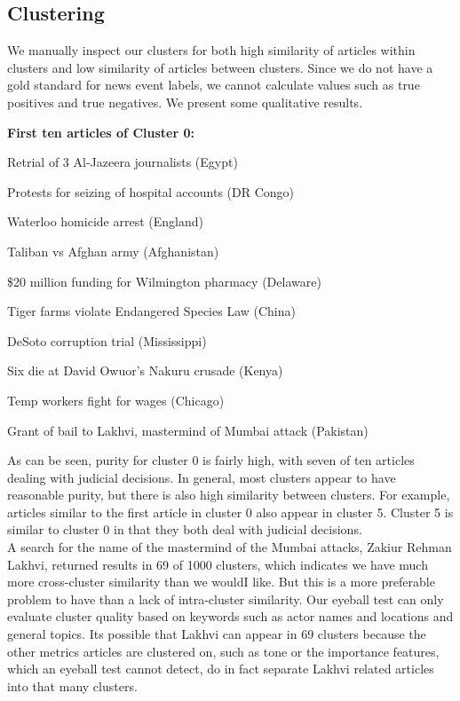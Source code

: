 
\subsection{Clustering}

We manually inspect our clusters for both high similarity of articles within clusters and low similarity of articles between clusters. Since we do not have a gold standard for news event labels, we cannot calculate values such as true positives and true negatives. We present some qualitative results.

\textbf{First ten articles of Cluster 0:}  
\begin{compactenum}
	\item Retrial of 3 Al-Jazeera journalists (Egypt)
	\item Protests for seizing of hospital accounts (DR Congo)
	\item Waterloo homicide arrest (England)
	\item Taliban vs Afghan army (Afghanistan)
	\item \$20 million funding for Wilmington pharmacy (Delaware)
	\item Tiger farms violate Endangered Species Law (China)
	\item DeSoto corruption trial (Mississippi)
	\item Six die at David Owuor's Nakuru crusade (Kenya)
	\item Temp workers fight for wages (Chicago)
	\item Grant of bail to Lakhvi, mastermind of Mumbai attack (Pakistan)
\end{compactenum}

As can be seen, purity for cluster 0 is fairly high, with seven of ten articles dealing with judicial decisions. In general, most clusters appear to have reasonable purity, but there is also high similarity between clusters. For example, articles similar to the first article in cluster 0 also appear in cluster 5. Cluster 5 is similar to cluster 0 in that they both deal with judicial decisions.\\

\noindent A search for the name of the mastermind of the Mumbai attacks, Zakiur Rehman Lakhvi, returned results in 69 of 1000 clusters, which indicates we have much more cross-cluster similarity than we wouldI like. But this is a more preferable problem to have than a lack of intra-cluster similarity. Our eyeball test can only evaluate cluster quality based on keywords such as actor names and locations and general topics. Its possible that Lakhvi can appear in 69 clusters because the other metrics articles are clustered on, such as tone or the importance features, which an eyeball test cannot detect, do in fact separate Lakhvi related articles into that many clusters.


